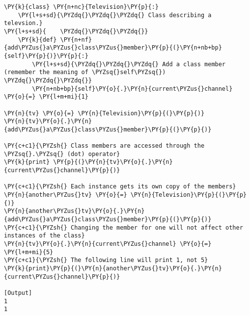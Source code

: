 \begin{Verbatim}[label=\makebox{\url{https://bitbucket.org/lbaldini/programming/src/tip/snippets/class\_members.py}},commandchars=\\\{\}]
\PY{k}{class} \PY{n+nc}{Television}\PY{p}{:}
    \PY{l+s+sd}{\PYZdq{}\PYZdq{}\PYZdq{} Class describing a televsion.}
\PY{l+s+sd}{    \PYZdq{}\PYZdq{}\PYZdq{}}
    \PY{k}{def} \PY{n+nf}{add\PYZus{}a\PYZus{}class\PYZus{}member}\PY{p}{(}\PY{n+nb+bp}{self}\PY{p}{)}\PY{p}{:}
        \PY{l+s+sd}{\PYZdq{}\PYZdq{}\PYZdq{} Add a class member (remember the meaning of \PYZsq{}self\PYZsq{}) \PYZdq{}\PYZdq{}\PYZdq{}}
        \PY{n+nb+bp}{self}\PY{o}{.}\PY{n}{current\PYZus{}channel} \PY{o}{=} \PY{l+m+mi}{1}

\PY{n}{tv} \PY{o}{=} \PY{n}{Television}\PY{p}{(}\PY{p}{)}
\PY{n}{tv}\PY{o}{.}\PY{n}{add\PYZus{}a\PYZus{}class\PYZus{}member}\PY{p}{(}\PY{p}{)}

\PY{c+c1}{\PYZsh{} Class members are accessed through the \PYZsq{}.\PYZsq{} (dot) operator}
\PY{k}{print} \PY{p}{(}\PY{n}{tv}\PY{o}{.}\PY{n}{current\PYZus{}channel}\PY{p}{)}

\PY{c+c1}{\PYZsh{} Each instance gets its own copy of the members}
\PY{n}{another\PYZus{}tv} \PY{o}{=} \PY{n}{Television}\PY{p}{(}\PY{p}{)}
\PY{n}{another\PYZus{}tv}\PY{o}{.}\PY{n}{add\PYZus{}a\PYZus{}class\PYZus{}member}\PY{p}{(}\PY{p}{)}
\PY{c+c1}{\PYZsh{} Changing the member for one will not affect other instances of the class}
\PY{n}{tv}\PY{o}{.}\PY{n}{current\PYZus{}channel} \PY{o}{=} \PY{l+m+mi}{5}
\PY{c+c1}{\PYZsh{} The following line will print 1, not 5}
\PY{k}{print}\PY{p}{(}\PY{n}{another\PYZus{}tv}\PY{o}{.}\PY{n}{current\PYZus{}channel}\PY{p}{)}

[Output]
1
1
\end{Verbatim}